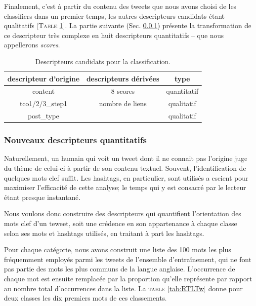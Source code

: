 \documentclass[twocolumn,10pt]{article}
\begin{document}
Finalement, c'est à partir du contenu des tweets que nous avons choisi de les classifiers dans un premier temps, les autres descripteurs candidats étant qualitatifs [\textsc{Table} \ref{tab:DCC}]. La partie suivante (Sec. \ref{sec:NDQ}) présente la transformation de ce descripteur très complexe en huit descripteurs quantitatifs -- que nous appellerons \textit{scores}.

\noindent\begin{table}[htbp]
\begin{center}
\begin{tabular}{cc|c}
descripteur d'origine & descripteurs dérivées & type \\
\hline 
content & 8 scores & quantitatif \\ 
tco1/2/3\_step1 & nombre de liens & qualitatif \\ 
post\_type & & qualitatif
\end{tabular} 
\caption{\label{tab:DCC}Descripteurs candidats pour la classification.}
\end{center} 
\end{table}


\subsubsection{Nouveaux descripteurs quantitatifs}\label{sec:NDQ}

Naturellement, un humain qui voit un tweet dont il ne connait pas l'origine juge du thème de celui-ci à partir de son contenu textuel. Souvent, l'identification de quelques mots clef suffit. Les hashtags, en particulier, sont utilisés a escient pour maximiser l'efficacité de cette analyse; le temps qui y est consacré par le lecteur étant presque instantané.

Nous voulons donc construire des descripteurs qui quantifient l'orientation des mots clef d'un teweet, soit une crédence en son appartenance à chaque classe selon ses mots et hashtags utilisés, en traitant à part les hashtags.

Pour chaque catégorie, nous avons construit une liste des 100 mots les plus fréquemment employés parmi les tweets de l'ensemble d'entraînement, qui ne font pas partie des mots les plus communs de la langue anglaise. L'occurrence de chaque mot est ensuite remplacée par la proportion qu'elle représente par rapport au nombre total d'occurrences dans la liste. La \textsc{table} \ref{tab:RTLTw} donne pour deux classes les dix premiers mots de ces classements.
\end{document}
